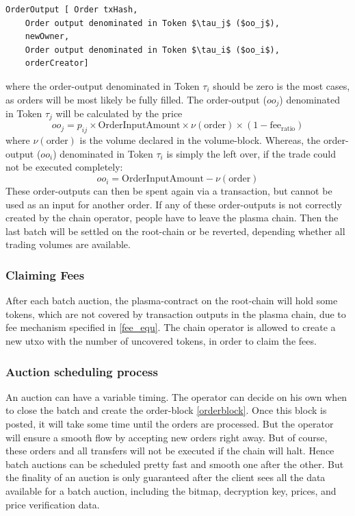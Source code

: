 \documentclass[11pt,parskip=full]{scrartcl}%
\begin{document}
\begin{lstlisting}
OrderOutput [ Order txHash,
    Order output denominated in Token $\tau_j$ ($oo_j$), 
    newOwner,
    Order output denominated in Token $\tau_i$ ($oo_i$),
    orderCreator]

\end{lstlisting}
where the order-output denominated in Token $\tau_i$ should be zero is the most cases, as orders will be most likely be fully filled. 
The order-output ($oo_j$) denominated in Token $\tau_j$ will be calculated by the price 
\begin{equation}
  oo_j = p_{ij} \times \text{OrderInputAmount} \times \nu(\text{order}) \times (1-\text{fee}_{\text{ratio}})
    \label{fee_equ}
\end{equation}
where $\nu(\text{order})$ is the volume declared in the volume-block.  
Whereas, the order-output ($oo_i$) denominated in Token $\tau_i$ is simply the left over, if the trade could not be executed completely: 
\begin{equation}
  oo_i =  \text{OrderInputAmount} - \nu(\text{order})
    \label{fee_equ}
\end{equation}
These order-outputs can then be spent again via a transaction, but cannot be used as an input for another order. 
If any of these order-outputs is not correctly created by the chain operator, people have to leave the plasma chain. 
Then the last batch will be settled on the root-chain or be reverted, depending whether all trading volumes are available. 

\subsubsection{Claiming Fees}
After each batch auction, the plasma-contract on the root-chain will hold some tokens, which are not covered by transaction outputs in the plasma chain, due to fee mechanism specified in \ref{fee_equ}. 
The chain operator is allowed to create a new utxo with the number of uncovered tokens, in order to claim the fees. 

\subsubsection{Auction scheduling process}

An auction can have a variable timing. 
The operator can decide on his own when to close the batch and create the order-block \ref{orderblock}. 
Once this block is posted, it will take some time until the orders are processed. 
But the operator will ensure a smooth flow by accepting new orders right away. 
But of course, these orders and all transfers will not be executed if the chain will halt. 
Hence batch auctions can be scheduled pretty fast and smooth one after the other. 
But the finality of an auction is only guaranteed after the client sees all the data available for a batch auction, including the bitmap, decryption key, prices, and price verification data. 
\end{document}

